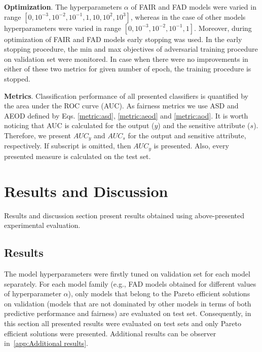 \documentclass[preprint,12pt]{elsarticle}
\begin{document}
\textbf{Optimization}. 
The hyperparameters $\alpha$ of FAIR and FAD models were varied in range $[0, 10^{-3}, 10^{-2}, 10^{-1}, 1, 10, 10^{2}, 10^{3}]$, whereas in the case of other models hyperparameters were varied in range $[0, 10^{-3}, 10^{-2}, 10^{-1}, 1]$. Moreover, during optimization of FAIR and FAD models early stopping was used. In the early stopping procedure, the min and max objectives of adversarial training procedure on validation set were monitored. In case when there were no improvements in either of these two metrics for given number of epoch, the training procedure is stopped.

\textbf{Metrics}. 
Classification performance of all presented classifiers is quantified by the area under the ROC curve (AUC). As fairness metrics we use ASD and AEOD defined by Eqs. \ref{metric:asd}, \ref{metric:aeod} and \ref{metric:aod}. It is worth noticing that AUC is calculated for the output ($y$) and the sensitive attribute ($s$). Therefore, we present $AUC_y$ and $AUC_s$ for the output and  sensitive attribute, respectively. If subscript is omitted, then $AUC_y$ is presented. Also, every presented measure is calculated on the test set.

\section{Results and Discussion}
\label{sec:ResultsDiscussion}
Results and discussion section present results obtained using above-presented experimental evaluation.

\subsection{Results}
\label{sec:Results}
The model hyperparameters were firstly tuned on validation set for each model separately. For each model family (e.g., FAD models obtained for different values of hyperparameter $\alpha$), only models that belong to the Pareto efficient solutions on validation (models that are not dominated by other models in terms of both predictive performance and fairness) \cite{marler2004survey} are evaluated on test set. Consequently, in this section all presented results were evaluated on test sets and only Pareto efficient solutions were presented. Additional results can be observer in~\ref{app:Additional results}.
\end{document}
